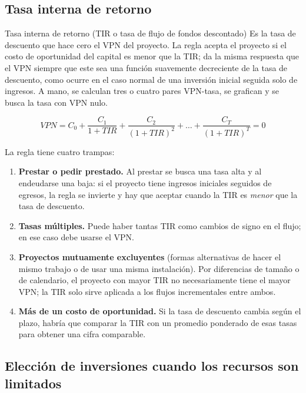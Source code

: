 \subsection{Tasa interna de retorno}

\begin{definicion}{Tasa interna de retorno (TIR o tasa de flujo de fondos descontado)}
Es la tasa de descuento que hace cero el VPN del proyecto. La regla acepta el proyecto si el costo de oportunidad del capital es menor que la TIR; da la misma respuesta que el VPN siempre que este sea una función suavemente decreciente de la tasa de descuento, como ocurre en el caso normal de una inversión inicial seguida solo de ingresos. A mano, se calculan tres o cuatro pares VPN-tasa, se grafican y se busca la tasa con VPN nulo.
\end{definicion}

\begin{formulaBox}
\[
VPN = C_0 + \frac{C_1}{1+TIR} + \frac{C_2}{(1+TIR)^{2}} + \dots + \frac{C_T}{(1+TIR)^{T}} = 0
\]
\end{formulaBox}

La regla tiene cuatro trampas:
\begin{enumerate}
\item \textbf{Prestar o pedir prestado.} Al prestar se busca una tasa alta y al endeudarse una baja: si el proyecto tiene ingresos iniciales seguidos de egresos, la regla se invierte y hay que aceptar cuando la TIR es \emph{menor} que la tasa de descuento.
\item \textbf{Tasas múltiples.} Puede haber tantas TIR como cambios de signo en el flujo; en ese caso debe usarse el VPN.
\item \textbf{Proyectos mutuamente excluyentes} (formas alternativas de hacer el mismo trabajo o de usar una misma instalación). Por diferencias de tamaño o de calendario, el proyecto con mayor TIR no necesariamente tiene el mayor VPN; la TIR solo sirve aplicada a los flujos incrementales entre ambos.
\item \textbf{Más de un costo de oportunidad.} Si la tasa de descuento cambia según el plazo, habría que comparar la TIR con un promedio ponderado de esas tasas para obtener una cifra comparable.
\end{enumerate}

\subsection{Elección de inversiones cuando los recursos son limitados}


